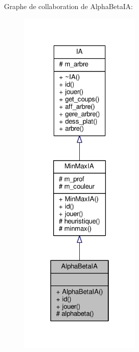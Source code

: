 Graphe de collaboration de Alpha\+Beta\+IA\+:\nopagebreak
\begin{figure}[H]
\begin{center}
\leavevmode
\includegraphics[width=166pt]{classAlphaBetaIA__coll__graph}
\end{center}
\end{figure}
